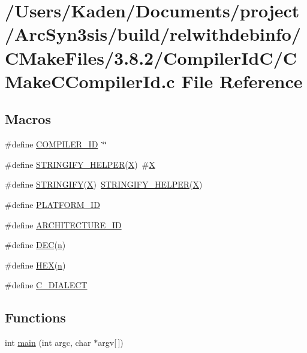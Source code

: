 \hypertarget{a00780}{}\section{/\+Users/\+Kaden/\+Documents/project/\+Arc\+Syn3sis/build/relwithdebinfo/\+C\+Make\+Files/3.8.2/\+Compiler\+Id\+C/\+C\+Make\+C\+Compiler\+Id.c File Reference}
\label{a00780}
\subsection*{Macros}
\begin{DoxyCompactItemize}
\item 
\#define \hyperlink{a00780_a81dee0709ded976b2e0319239f72d174}{C\+O\+M\+P\+I\+L\+E\+R\+\_\+\+ID}~\char`\"{}\char`\"{}
\item 
\#define \hyperlink{a00780_a2ae9b72bb13abaabfcf2ee0ba7d3fa1d}{S\+T\+R\+I\+N\+G\+I\+F\+Y\+\_\+\+H\+E\+L\+P\+ER}(\hyperlink{a00611_a708712aede48a739e9ae0c42413ef460}{X})~\#\hyperlink{a00611_a708712aede48a739e9ae0c42413ef460}{X}
\item 
\#define \hyperlink{a00780_a43e1cad902b6477bec893cb6430bd6c8}{S\+T\+R\+I\+N\+G\+I\+FY}(\hyperlink{a00611_a708712aede48a739e9ae0c42413ef460}{X})~\hyperlink{a00801_a2ae9b72bb13abaabfcf2ee0ba7d3fa1d}{S\+T\+R\+I\+N\+G\+I\+F\+Y\+\_\+\+H\+E\+L\+P\+ER}(\hyperlink{a00611_a708712aede48a739e9ae0c42413ef460}{X})
\item 
\#define \hyperlink{a00780_adbc5372f40838899018fadbc89bd588b}{P\+L\+A\+T\+F\+O\+R\+M\+\_\+\+ID}
\item 
\#define \hyperlink{a00780_aba35d0d200deaeb06aee95ca297acb28}{A\+R\+C\+H\+I\+T\+E\+C\+T\+U\+R\+E\+\_\+\+ID}
\item 
\#define \hyperlink{a00780_ad1280362da42492bbc11aa78cbf776ad}{D\+EC}(\hyperlink{a00623_a781a04ab095280f838ff3eb0e51312e0}{n})
\item 
\#define \hyperlink{a00780_a46d5d95daa1bef867bd0179594310ed5}{H\+EX}(\hyperlink{a00623_a781a04ab095280f838ff3eb0e51312e0}{n})
\item 
\#define \hyperlink{a00780_a07f8e5783674099cd7f5110e22a78cdb}{C\+\_\+\+D\+I\+A\+L\+E\+CT}
\end{DoxyCompactItemize}
\subsection*{Functions}
\begin{DoxyCompactItemize}
\item 
int \hyperlink{a00780_a0ddf1224851353fc92bfbff6f499fa97}{main} (int argc, char $\ast$argv\mbox{[}$\,$\mbox{]})
\end{DoxyCompactItemize}
